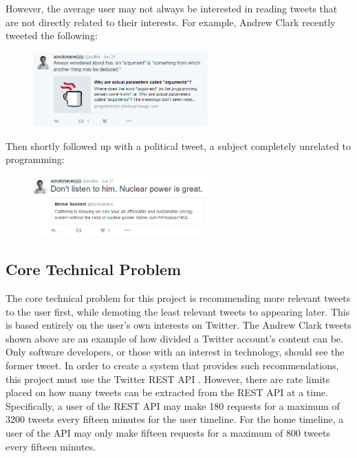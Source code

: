 \documentclass{article}
\begin{document}
However, the average user may not always be interested in reading tweets that are not directly related to their interests. For example, Andrew Clark recently tweeted the following\cite{clark1}:

\begin{figure}[H]
    \includegraphics[width=0.6\textwidth, center]{clark1}
\end{figure}

Then shortly followed up with a political tweet, a subject completely unrelated to programming\cite{clark2}:

\begin{figure}[H]
    \includegraphics[width=0.6\textwidth, center]{clark2}
\end{figure}


\subsection{Core Technical Problem} 
The core technical problem for this project is recommending more relevant tweets to the user first, while demoting the least relevant tweets to appearing later. This is based entirely on the user's own interests on Twitter. The Andrew Clark tweets shown above are an example of how divided a Twitter account's content can be. Only software developers, or those with an interest in technology, should see the former tweet.
In order to create a system that provides such recommendations, this project must use the Twitter REST API \cite{twitter-rest-api}. However, there are rate limits placed on how many tweets can be extracted from the REST API at a time. Specifically, a user of the REST API may make 180 requests for a maximum of 3200 tweets every fifteen minutes for the user timeline. For the home timeline, a user of the API may only make fifteen requests for a maximum of 800 tweets every fifteen minutes. 
\end{document}
